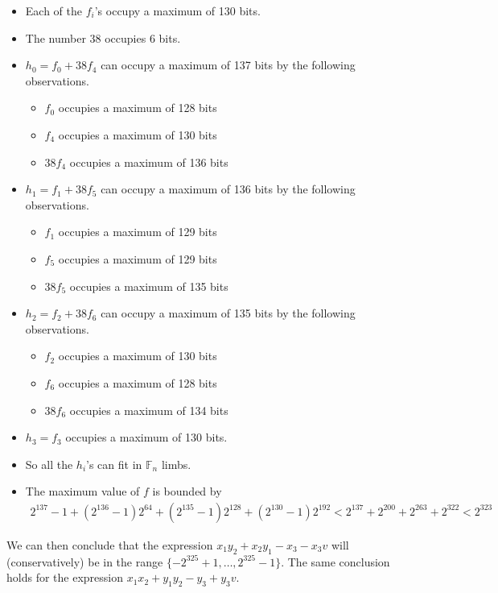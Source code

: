 \documentclass[a4paper, 12pt]{article}
\begin{document}
\begin{itemize}
  \item Each of the $f_i$'s occupy a maximum of 130 bits.
  \item The number 38 occupies 6 bits.
  \item $h_0 = f_0 + 38 f_4$ can occupy a maximum of 137 bits by the following observations.
    \begin{itemize}
      \item $f_0$ occupies a maximum of 128 bits
      \item $f_4$ occupies a maximum of 130 bits
      \item $38f_4$ occupies a maximum of 136 bits
    \end{itemize}
  \item $h_1 = f_1 + 38 f_5$ can occupy a maximum of 136 bits by the following observations.
    \begin{itemize}
      \item $f_1$ occupies a maximum of 129 bits
      \item $f_5$ occupies a maximum of 129 bits
      \item $38f_5$ occupies a maximum of 135 bits
    \end{itemize}
  \item $h_2 = f_2 + 38 f_6$ can occupy a maximum of 135 bits by the following observations.
    \begin{itemize}
      \item $f_2$ occupies a maximum of 130 bits
      \item $f_6$ occupies a maximum of 128 bits
      \item $38f_6$ occupies a maximum of 134 bits
    \end{itemize}
  \item $h_3 = f_3$ occupies a maximum of 130 bits.
  \item So all the $h_i$'s can fit in $\mathbb{F}_n$ limbs.
  \item The maximum value of $f$ is bounded by
    \begin{align*}
      2^{137} - 1 + \left(2^{136} - 1\right) 2^{64}+ \left( 2^{135}-1 \right)2^{128}+ \left( 2^{130}-1 \right)2^{192} < 2^{137} + 2^{200} + 2^{263} + 2^{322} < 2^{323}
    \end{align*}
\end{itemize}

We can then conclude that the expression $x_1y_2+x_2y_1-x_3-x_3v$ will (conservatively) be in the range $\{-2^{325}+1,\ldots,2^{325}-1\}$. The same conclusion holds for the expression $x_1x_2 + y_1y_2 -y_3 + y_3 v$.
\end{document}
